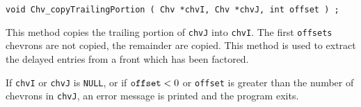 \begin{enumerate}
\begin{verbatim}
void Chv_copyTrailingPortion ( Chv *chvI, Chv *chvJ, int offset ) ;
\end{verbatim}
This method copies the trailing portion of {\tt chvJ} into {\tt chvI}.
The first {\tt offsets} chevrons are not copied, the remainder are
copied.
This method is used to extract the delayed entries from a front
which has been factored.
\par {}
If {\tt chvI} or {\tt chvJ} is {\tt NULL},
or if ${\tt offset} < 0$ or {\tt offset} is greater than the number
of chevrons in {\tt chvJ},
an error message is printed and the program exits.
\end{enumerate}
\par

